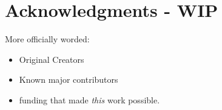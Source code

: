 \chapter*{Acknowledgments - WIP}

More officially worded:
\begin{itemize}
 em
\item Original Creators
\item Known major contributors
\item funding that made \emph{this} work possible.
\end{itemize}
